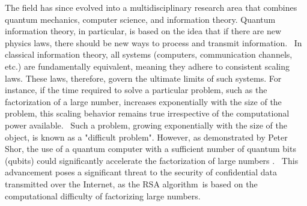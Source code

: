 The field has since evolved into a multidisciplinary research area that combines quantum mechanics, computer science, and information theory. Quantum information theory, in particular, is based on the idea that if there are new physics laws, there should be new ways to process and transmit information.  In classical information theory, all systems (computers, communication channels, etc.) are fundamentally equivalent, meaning they adhere to consistent scaling laws. These laws, therefore, govern the ultimate limits of such systems. For instance, if the time required to solve a particular problem, such as the factorization of a large number, increases exponentially with the size of the problem, this scaling behavior remains true irrespective of the computational power available.  Such a problem, growing exponentially with the size of the object, is known as a "difficult problem". However, as demonstrated by Peter Shor, the use of a quantum computer with a sufficient number of quantum bits (qubits) could significantly accelerate the factorization of large numbers \cite{shor1994algorithms}.  This advancement poses a significant threat to the security of confidential data transmitted over the Internet, as the RSA algorithm is based on the computational difficulty of factorizing large numbers.


